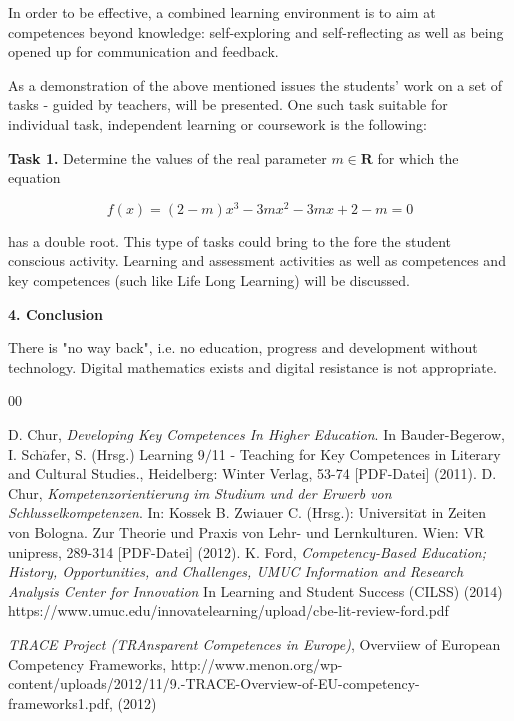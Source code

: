 \documentclass[11pt]{article}
\begin{document}
In order to be effective, a combined learning environment is to aim at competences beyond knowledge: self-exploring and self-reflecting as well as being opened up for communication and feedback.

As a demonstration of the above mentioned issues the students' work on a set of tasks - guided by teachers, will be presented.  One such task suitable for individual task, independent learning or coursework is the following:

\textbf{Task 1.} Determine the values of the real parameter $m\in \mathbf{R} $  for which the equation

\begin{equation}
f(x) = (2-m)x^3-3mx^2-3mx+ 2-m = 0 \label{eq1}
\end{equation}

has a double root.
This type of tasks could bring to the fore the student conscious activity. Learning and assessment activities as well as competences and key competences (such like Life Long Learning) will be discussed.

  \vspace{2mm}


\textbf{4. Conclusion }

\vspace{2mm}

There is "no way back", i.e. no education, progress and development without technology. Digital mathematics exists and digital resistance is not appropriate.



\begin{thebibliography}{00}
\setlength{\itemsep}{-1mm}
\footnotesize


 D. Chur, \textit{Developing Key Competences In Higher Education}. In Bauder-Begerow, I. Sch$\ddot{a}$fer, S. (Hrsg.) Learning 9$/$11 - Teaching for Key Competences in Literary and Cultural Studies., Heidelberg: Winter Verlag,  53-74 [PDF-Datei] (2011).
  D. Chur, \textit{Kompetenzorientierung im Studium und der Erwerb von Schlusselkompetenzen}. In: Kossek B. Zwiauer C. (Hrsg.): Universit$\ddot{a}$t in Zeiten von Bologna. Zur Theorie und Praxis von Lehr- und Lernkulturen. Wien: VR unipress, 289-314 [PDF-Datei] (2012).
      K. Ford, \textit{Competency-Based Education; History, Opportunities, and Challenges, UMUC Information and Research Analysis Center for Innovation} In Learning and Student Success (CILSS) (2014)   https://www.umuc.edu/innovatelearning/upload/cbe-lit-review-ford.pdf

 \textit{TRACE Project (TRAnsparent Competences in Europe)}, Overviiew of European Competency Frameworks, http://www.menon.org/wp-content/uploads/2012/11/9.-TRACE-Overview-of-EU-competency-frameworks1.pdf, (2012)



\end{thebibliography}
\normalsize
\end{document}
